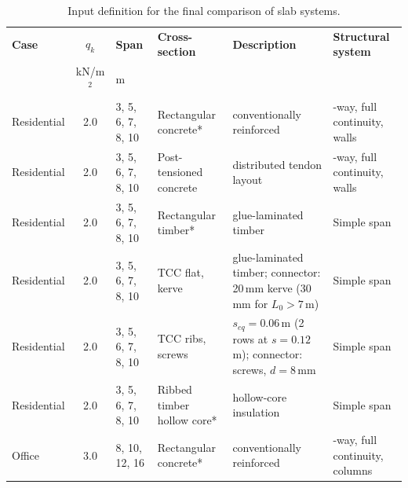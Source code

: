 \begin{table}[h]
    \centering
    \begingroup
    \scriptsize
    \caption{Input definition for the final comparison of slab systems. \label{tab:final_comparison_cases}}
    \setlength{\tabcolsep}{3.5pt}
    \renewcommand{\arraystretch}{1.2}
    \begin{tabularx}{\textwidth}{@{}l|c|l|>{\raggedright\arraybackslash}X|>{\raggedright\arraybackslash}X|>{\raggedright\arraybackslash}X@{}}
    \hline
    \textbf{Case} &
    \textbf{$q_k$} &
    \textbf{Span} &
    \textbf{Cross-section} &
    \textbf{Description} &
    \textbf{Structural system} \\
    & kN/m$^2$ & m & & & \\ \hline
    Residential & 2.0 & 3, 5, 6, 7, 8, 10 &
    Rectangular concrete* &
    conventionally reinforced &
    2-way, full continuity, walls \\

    Residential & 2.0 & 3, 5, 6, 7, 8, 10 &
    Post-tensioned concrete &
    distributed tendon layout &
    2-way, full continuity, walls \\

    Residential & 2.0 & 3, 5, 6, 7, 8, 10 &
    Rectangular timber* &
    glue-laminated timber &
    Simple span \\

    Residential & 2.0 & 3, 5, 6, 7, 8, 10 &
    TCC flat, kerve &
    glue-laminated timber; connector: 20\,mm kerve (30\,mm for $L_0>7$\,m) \cite{Morkoetter2021_HBVDecken}&
    Simple span \\

    Residential & 2.0 & 3, 5, 6, 7, 8, 10 &
    TCC ribs, screws &
    $s_{eq}=0.06$\,m (2 rows at $s=0.12$\,m); connector: screws, $d=8$\,mm \cite{Morkoetter2021_HBVDecken, Wuerth2021_HolzBetonVerbund}&
    Simple span \\

    Residential & 2.0 & 3, 5, 6, 7, 8, 10 &
    Ribbed timber hollow core* &
    hollow-core insulation &
    Simple span \\

    Office & 3.0 & 8, 10, 12, 16 &
    Rectangular concrete* &
    conventionally reinforced &
    2-way, full continuity, columns \\


\end{tabularx}
\end{table}
